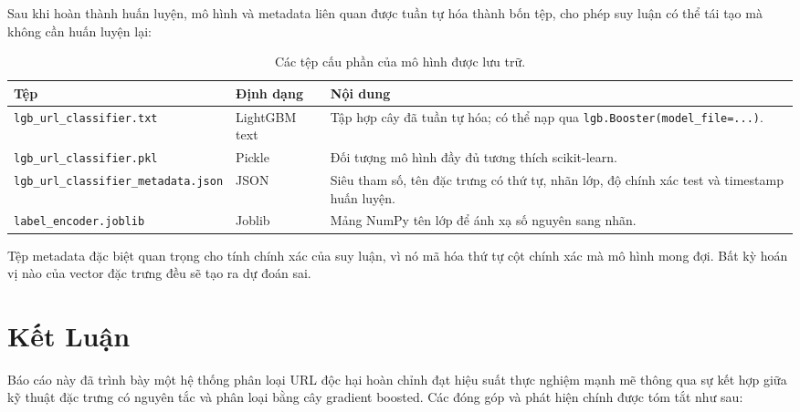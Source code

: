 \documentclass[a4paper,12pt]{article}
\begin{document}
Sau khi hoàn thành huấn luyện, mô hình và metadata liên quan được tuần tự hóa thành bốn tệp, cho phép suy luận có thể tái tạo mà không cần huấn luyện lại:

\begin{table}[H]
\centering
\caption{Các tệp cấu phần của mô hình được lưu trữ.}
\label{tab:artifacts}
\begin{tabular}{llp{6cm}}
\toprule
\textbf{Tệp} & \textbf{Định dạng} & \textbf{Nội dung} \\
\midrule
\texttt{lgb\_url\_classifier.txt} & LightGBM text & Tập hợp cây đã tuần tự hóa; có thể nạp qua \texttt{lgb.Booster(model\_file=...)}. \\
\texttt{lgb\_url\_classifier.pkl} & Pickle & Đối tượng mô hình đầy đủ tương thích scikit-learn. \\
\texttt{lgb\_url\_classifier\_metadata.json} & JSON & Siêu tham số, tên đặc trưng có thứ tự, nhãn lớp, độ chính xác test và timestamp huấn luyện. \\
\texttt{label\_encoder.joblib} & Joblib & Mảng NumPy tên lớp để ánh xạ số nguyên sang nhãn. \\
\bottomrule
\end{tabular}
\end{table}

Tệp metadata đặc biệt quan trọng cho tính chính xác của suy luận, vì nó mã hóa thứ tự cột chính xác mà mô hình mong đợi. Bất kỳ hoán vị nào của vector đặc trưng đều sẽ tạo ra dự đoán sai.

\section{Kết Luận}
\label{sec:conclusion}

Báo cáo này đã trình bày một hệ thống phân loại URL độc hại hoàn chỉnh đạt hiệu suất thực nghiệm mạnh mẽ thông qua sự kết hợp giữa kỹ thuật đặc trưng có nguyên tắc và phân loại bằng cây gradient boosted. Các đóng góp và phát hiện chính được tóm tắt như sau:
\end{document}
